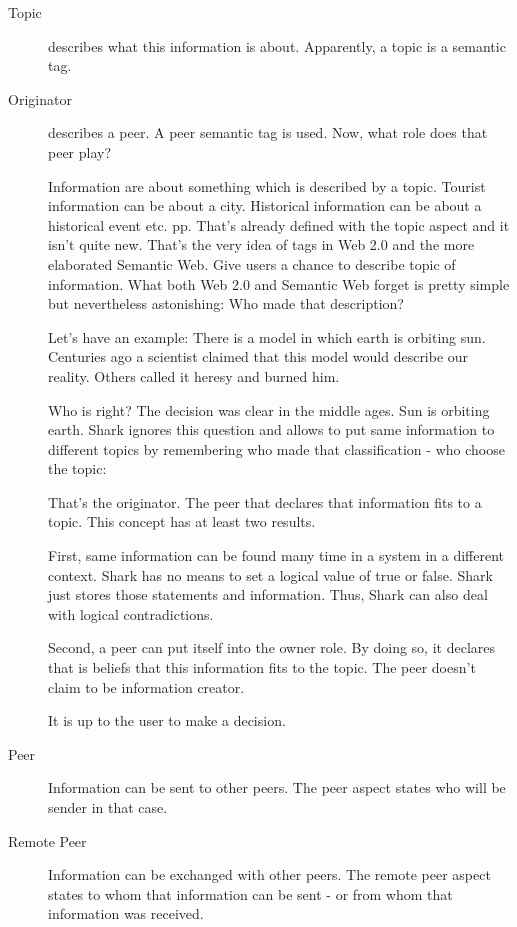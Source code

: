 \begin{description}
    \item[Topic] describes what this information is about. Apparently, a topic is a semantic tag. 
    \item[Originator] describes a peer. A peer semantic tag is used. Now, what role does that peer play? 

Information are about something which is described by a topic. Tourist information can be about a city. Historical information can be about a historical event etc. pp. That's already defined with the topic aspect and it isn't quite new. That's the very idea of tags in Web 2.0 and the more elaborated Semantic Web. Give users a chance to describe topic of information. What both Web 2.0 and Semantic Web forget is pretty simple but nevertheless astonishing:
Who made that description?

Let's have an example:
There is a model in which earth is orbiting sun. Centuries ago a scientist claimed that this model would describe our reality. Others called it heresy and burned him.  

Who is right? The decision was clear in the middle ages. Sun is orbiting earth. 
Shark ignores this question and allows to put same information to different topics by remembering who made that classification - who choose the topic:

That's the originator. The peer that declares that information fits to a topic. 
This concept has at least two results.

First, same information can be found many time in a system in a different context. Shark has no means to set a logical value of true or false. Shark just stores those statements and information. Thus, Shark can also deal with logical contradictions.

Second, a peer can put itself into the owner role. By doing so, it declares that is beliefs that this information fits to the topic. The peer doesn't claim to be information creator.

It is up to the user to make a decision.

    \item[Peer] Information can be sent to other peers. The peer aspect states who will be sender in that case.

    \item[Remote Peer] Information can be exchanged with other peers. The remote peer aspect states to whom that information can be sent - or from whom that information was received.


\end{description}
